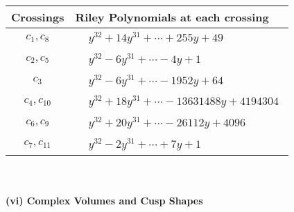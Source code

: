 \documentclass[1p]{elsarticle_modified}
\theoremstyle{definition}
\begin{document}
\begin{tabular}{m{50pt}|m{274pt}}
Crossings & \hspace{64pt}Riley Polynomials at each crossing \\
\hline $$\begin{aligned}c_{1},c_{8}\end{aligned}$$&$\begin{aligned}
&y^{32}+14 y^{31}+\cdots+255 y+49
\end{aligned}$\\
\hline $$\begin{aligned}c_{2},c_{5}\end{aligned}$$&$\begin{aligned}
&y^{32}-6 y^{31}+\cdots-4 y+1
\end{aligned}$\\
\hline $$\begin{aligned}c_{3}\end{aligned}$$&$\begin{aligned}
&y^{32}-6 y^{31}+\cdots-1952 y+64
\end{aligned}$\\
\hline $$\begin{aligned}c_{4},c_{10}\end{aligned}$$&$\begin{aligned}
&y^{32}+18 y^{31}+\cdots-13631488 y+4194304
\end{aligned}$\\
\hline $$\begin{aligned}c_{6},c_{9}\end{aligned}$$&$\begin{aligned}
&y^{32}+20 y^{31}+\cdots-26112 y+4096
\end{aligned}$\\
\hline $$\begin{aligned}c_{7},c_{11}\end{aligned}$$&$\begin{aligned}
&y^{32}-2 y^{31}+\cdots+7 y+1
\end{aligned}$\\
\hline
\end{tabular}\\~\\
\newpage\flushleft \textbf{(vi) Complex Volumes and Cusp Shapes}
\end{document}
